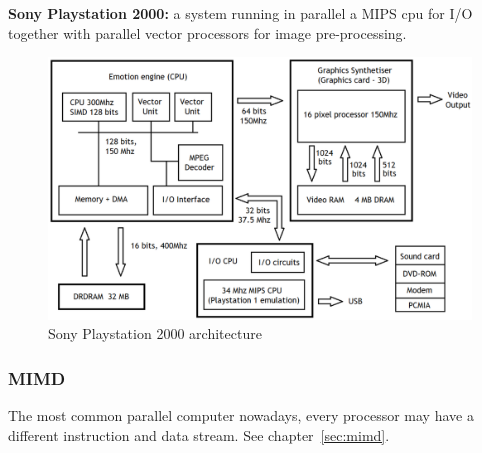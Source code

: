 \textbf{Sony Playstation 2000:} a system running in parallel a MIPS cpu for I/O together with parallel
vector processors for image pre-processing.
\begin{figure}[h]
    \centering
    \includegraphics[scale = 0.2]{images/sony-playstation-2000}
    \caption{Sony Playstation 2000 architecture}
    \label{fig:sony-playstation}
\end{figure}

\subsubsection{MIMD}
The most common parallel computer nowadays, every processor may have a different instruction and data stream.
See chapter~\ref{sec:mimd}.
